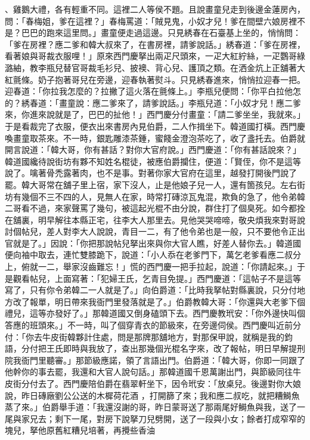\begin{showcontents}{}
、雞鵝大禮，各有輕重不同。這裡二人等侯不題。且說畫童兒走到後邊金蓮房內，問：「春梅姐，爹在這裡？」春梅罵道：「賊見鬼，小奴才兒！爹在間壁六娘房裡不是？巴巴的跑來這里問。」畫童便走過這邊。只見綉春在石臺基上坐的，悄悄問：「爹在房裡？應二爹和韓大叔來了，在書房裡，請爹說話。」綉春道：「爹在房裡，看著娘與哥裁衣服哩！」原來西門慶拏出兩疋尺頭來，一疋大紅紵絲，一疋鸚哥綠潞紬，教李瓶兒替官哥裁毛衫兒、披襖、背心兒、護頂之類。在洒金炕上正舖著大紅氈條。奶子抱著哥兒在旁邊，迎春執著熨斗。只見綉春進來，悄悄拉迎春一把。迎春道：「你拉我怎麼的？拉撇了這火落在氈條上。」李瓶兒便問：「你平白拉他怎的？綉春道：「畫童說：應二爹來了，請爹說話。」李瓶兒道：「小奴才兒！應二爹來，你進來說就是了，巴巴的扯他！」西門慶分付畫童：「請二爹坐坐，我就來。」于是看裁完了衣服，便衣出來書房內見伯爵，二人作揖坐下。韓道國打橫。西門慶喚畫童取茶來。不一時，銀匙雕漆茶鍾，蜜餞金澄泡茶吃了，收了盞托去。伯爵就開言說道：「韓大哥，你有甚話？對你大官府說。」西門慶道：「你有甚話說來？」韓道國纔待說街坊有夥不知姓名棍徒，被應伯爵攔住，便道：「賢侄，你不是這等說了。噙著骨禿露著肉，也不是事。對著你家大官府在這里，越發打開後門說了罷。韓大哥常在舖子里上宿，家下沒人，止是他娘子兒一人，還有箇孩兒。左右街坊有幾個不三不四的人，見無人在家，時常打磚涼瓦鬼混，欺負的急了，他令弟韓二哥看不過，來家聲罵了幾句，被這起光棍不由分說，群住打了個臭死。如今都拴在舖裏，明早解往本縣正宅，往李大人那里去。見他哭哭啼啼，敬央煩我來對哥說討個帖兒，差人對李大人說說，青目一二，有了他令弟也是一般，只不要他令正出官就是了。」因說：「你把那說帖兒拏出來與你大官人瞧，好差人替你去。」韓道國便向袖中取去，連忙雙膝跪下，說道：「小人忝在老爹門下，萬乞老爹看應二叔分上，俯就一二，舉家沒齒難忘！」慌的西門慶一把手拉起，說道：「你請起來。」于是觀看帖兒，上面寫著：「犯婦王氏，乞青目免提。」西門慶道：「這帖子不是這等寫了，只有你令弟韓二一人就是了。」向伯爵道：「比時我拏帖對縣裏說，只分付地方改了報單，明日帶來我衙門里發落就是了。」伯爵教韓大哥：「你還與大老爹下個禮兒，這等亦發好了。」那韓道國又倒身磕頭下去。西門慶教玳安：「你外邊快叫個答應的班頭來。」不一時，叫了個穿青衣的節級來，在旁邊伺侯。西門慶叫近前分付：「你去牛皮街韓夥計住處，問是那牌那舖地方，對那保甲說，就稱是我的鈞語，分付把王氏即時與我放了，查出那幾個光棍名字來，改了報帖，明日早解提刑院我衙門里聽審。」那節級應諾，領了言語出門。伯爵道：「韓大哥，你即一同跟了他幹你的事去罷，我還和大官人說句話。」那韓道國千恩萬謝出門，與節級同往牛皮街分付去了。西門慶陪伯爵在翡翠軒坐下，因令玳安：「放桌兒。後邊對你大娘說，昨日磚廠劉公公送的木樨荷花酒 ，打開篩了來；我和應二叔吃，就把糟鰣魚 蒸了來。」伯爵舉手道：「我還沒謝的哥，昨日蒙哥送了那兩尾好鰣魚與我，送了一尾與家兄去；剩下一尾，對房下說拏刀兒劈開，送了一段與小女；餘者打成窄窄的塊兒，拏他原舊紅糟兒培著，再攪些香油 
\end{showcontents}
